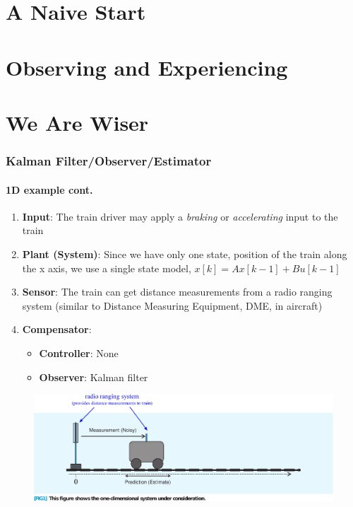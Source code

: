 \section{A Naive Start}



\section{Observing and Experiencing}


\section{We Are Wiser}

\begin{frame}[plain]\pw\Large
\frametitle{Kalman Filter/Observer/Estimator}
\framesubtitle{1D example \tiny cont.}

\scriptsize

\begin{enumerate}\scriptsize
\item \textbf{Input}: The train driver may apply a \emph{braking} or \emph{accelerating} input to the train
\item \textbf{Plant (System)}: Since we have only one state, position of the train along the x axis, we use a single state model, $x[k]=Ax[k-1]+Bu[k-1]$
\item \textbf{Sensor}: The train can get distance measurements from a radio ranging system (similar to Distance Measuring Equipment, DME, in aircraft)
\item \textbf{Compensator}:
\begin{itemize}\scriptsize
\item \textbf{Controller}: None 
\item \textbf{Observer}: Kalman filter
\end{itemize}
\end{enumerate}
\begin{figure}[h]
\centering
\includegraphics[width=1.35\textwidth]{figs/2012_MAG_Understanding_the_Basis_of_the_Kalman_Filter_fig1.pdf}
\end{figure}

\end{frame}









